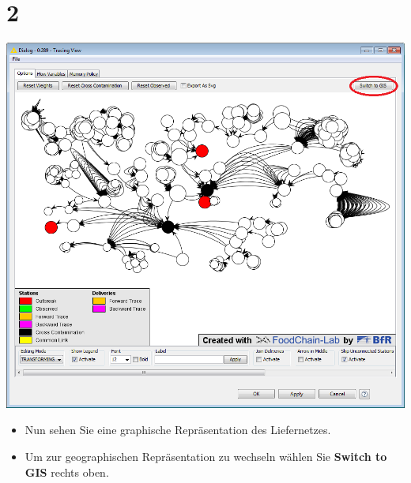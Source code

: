 \documentclass{beamer}
\begin{document}
\section{2}
\begin{frame}
	\begin{center}
  		\includegraphics[height=0.6\textheight]{2.png}
	\end{center}
	\begin{itemize}
		\item Nun sehen Sie eine graphische Repräsentation des Liefernetzes.
		\item Um zur geographischen Repräsentation zu wechseln wählen Sie \textbf{Switch to GIS} rechts oben.
	\end{itemize}
\end{frame}
\end{document}
